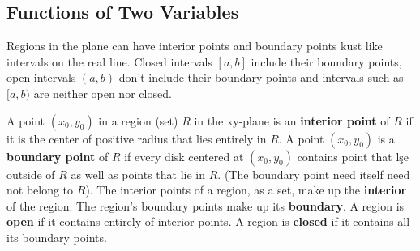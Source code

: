 \documentclass[12pt,a4paper]{article}
\newenvironment{definition}{\begin{definitionbox}}{\end{definitionbox}\vspace{1\baselineskip}}
\begin{document}
\newpage


\subsection{Functions of Two Variables}

Regions in the plane can have interior points and boundary points kust like intervals on the real line.
Closed intervals \([a, b]\) include their boundary points, open intervals \((a,b)\) don't include their boundary points and intervals such as \([a,b)\) are neither open nor closed.

\begin{definition}
    A point \((x_0, y_0)\) in a region (set) \(R\) in the xy-plane is an \textbf{interior point} of \(R\) if it is the center of positive radius that lies entirely in \(R\).
    A point \((x_0, y_0)\) is a \textbf{boundary point} of \(R\) if every disk centered at \((x_0, y_0)\) contains point that lşe outside of \(R\)  as well as points that lie in \(R\). (The boundary point need itself need not belong to \(R\)).
    The interior points of a region, as a set, make up the \textbf{interior} of the region. The region's boundary points make up its \textbf{boundary}.
    A region is \textbf{open} if it contains entirely of interior points. A region is \textbf{closed} if it contains all its boundary points.

\end{definition}
\end{document}
